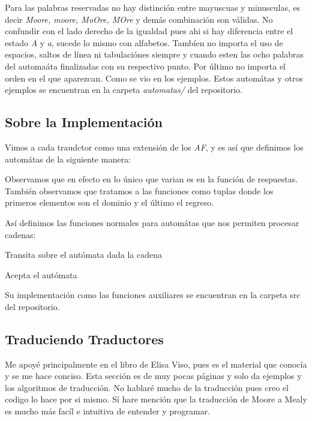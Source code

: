 \documentclass[11pt,letterpaper]{article}
\begin{document}
\begin{multicols}{2}
  Para las palabras reservadas no hay distinción entre mayuscuas y minusculas, es decir
  {\it Moore, moore, MoOre, MOre} y demás combinación son válidas. No confundir con
  el lado derecho de la igualdad pues ahi si hay diferencia entre el estado {\it A} y {\it a},
  sucede lo mismo con alfabetos. Tambíen no importa el uso de espacios, saltos de línea
  ni tabulaciónes siempre y cuando esten las ocho palabras del automaáta finalizadas con
  su respectivo punto. Por último no importa el orden en el que aparezcan. Como se vio en
  los ejemplos. Estos automátas y otros ejemplos se encuentran en la carpeta {\it automatas/}
  del repositorio.
  
  \subsection{Sobre la Implementación}

  Vimos a cada traudctor como una extensión de los {\it AF}, y es así que definimos los
  automátas de la siguiente manera:

  

  Observamos que en efecto en lo único
  que varian es en la función de respuestas.
  También observamos que tratamos a las funciones
  como tuplas donde los primeros elementos son
  el dominio y el último el regreso.
  
  Así definimos las funciones normales para automátas que nos permiten procesar cadenas:

  Transita sobre el autómata dada la cadena
  

  Acepta el autómata
  

  Su implementación como las funciones auxiliares se encuentran en la carpeta src
  del repositorio.

  \subsection{Traduciendo Traductores}
  
  Me apoyé principalmente en el libro de Elisa Viso, pues es el material que conocía
  y se me hace conciso. Esta sección es de muy pocas páginas y solo da ejemplos
  y los algoritmos de traducción. No hablaré mucho de la traducción pues creo
  el codigo lo hace por si mismo. Sí hare mención que la traducción de Moore a Mealy
  es mucho más facíl e intuitiva de entender y programar. 
  

\end{multicols}
\end{document}
